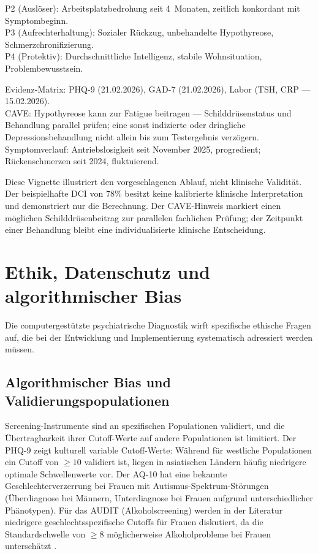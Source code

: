 \documentclass[11pt,a4paper]{article}
\begin{document}
\begin{description}[style=nextline, leftmargin=1.5cm, font=\bfseries\small]
P2 (Ausl\"oser): Arbeitsplatzbedrohung seit 4~Monaten, zeitlich konkordant mit Symptombeginn. \\
P3 (Aufrechterhaltung): Sozialer R\"uckzug, unbehandelte Hypothyreose, Schmerzchronifizierung. \\
P4 (Protektiv): Durchschnittliche Intelligenz, stabile Wohnsituation, Problembewusstsein.
\item[Achse~VI (Belegsammlung)]
Evidenz-Matrix: PHQ-9 (21.02.2026), GAD-7 (21.02.2026), Labor (TSH, CRP --- 15.02.2026). \\
CAVE: Hypothyreose kann zur Fatigue beitragen --- Schilddr\"usenstatus und Behandlung parallel pr\"ufen; eine sonst indizierte oder dringliche Depressionsbehandlung nicht allein bis zum Testergebnis verz\"ogern. \\
Symptomverlauf: Antriebslosigkeit seit November 2025, progredient; R\"uckenschmerzen seit 2024, fluktuierend.
\end{description}

\noindent Diese Vignette illustriert den vorgeschlagenen Ablauf, nicht klinische Validit\"at. Der beispielhafte DCI von 78\% besitzt keine kalibrierte klinische Interpretation und demonstriert nur die Berechnung. Der CAVE-Hinweis markiert einen m\"oglichen Schilddr\"usenbeitrag zur parallelen fachlichen Pr\"ufung; der Zeitpunkt einer Behandlung bleibt eine individualisierte klinische Entscheidung.


\section{Ethik, Datenschutz und algorithmischer Bias}
\label{sec:ethik}

Die computergest\"utzte psychiatrische Diagnostik wirft spezifische ethische Fragen auf, die bei der Entwicklung und Implementierung systematisch adressiert werden m\"ussen.

\subsection{Algorithmischer Bias und Validierungspopulationen}

Screening-Instrumente sind an spezifischen Populationen validiert, und die \"Ubertragbarkeit ihrer Cutoff-Werte auf andere Populationen ist limitiert. Der PHQ-9 zeigt kulturell variable Cutoff-Werte: W\"ahrend f\"ur westliche Populationen ein Cutoff von $\geq 10$ validiert ist, liegen in asiatischen L\"andern h\"aufig niedrigere optimale Schwellenwerte vor. Der AQ-10 hat eine bekannte Geschlechterverzerrung bei Frauen mit Autismus-Spektrum-St\"orungen (\"Uberdiagnose bei M\"annern, Unterdiagnose bei Frauen aufgrund unterschiedlicher Ph\"anotypen). F\"ur das AUDIT (Alkoholscreening) werden in der Literatur niedrigere geschlechtsspezifische Cutoffs f\"ur Frauen diskutiert, da die Standardschwelle von $\geq 8$ m\"oglicherweise Alkoholprobleme bei Frauen untersch\"atzt \citep{Saunders1993}.
\end{document}
